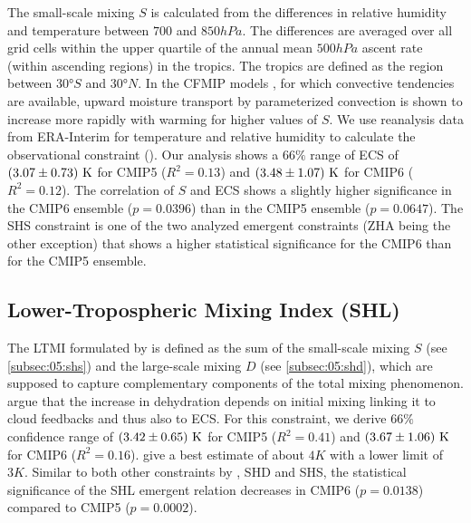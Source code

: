 The small-scale mixing $S$ \autocite{Sherwood2014} is calculated from the
differences in relative humidity and temperature between $700$ and $850
\unit{hPa}$. The differences are averaged over all grid cells within the upper
quartile of the annual mean $500 \unit{hPa}$ ascent rate (within ascending
regions) in the tropics. The tropics are defined as the region between $30
\unit{\degree S}$ and $30 \unit{\degree N}$. In the \ac{CFMIP} models
\autocite{Webb2017}, for which convective tendencies are available, upward
moisture transport by parameterized convection is shown to increase more
rapidly with warming for higher values of $S$. We use reanalysis data from
ERA-Interim \autocite{Dee2011} for temperature and relative humidity to
calculate the observational constraint (). Our analysis shows
a $66 \unit{\%}$ range of \ac{ECS} of $\pmrangeunit{3.07}{0.73}{K}$ for
\acs{CMIP}5 ($R^2 = 0.13$) and $\pmrangeunit{3.48}{1.07}{K}$ for \acs{CMIP}6
($R^2 = 0.12$). The correlation of $S$ and \acs{ECS} shows a slightly higher
significance in the \acs{CMIP}6 ensemble ($p = 0.0396$) than in the \acs{CMIP}5
ensemble ($p = 0.0647$). The SHS constraint is one of the two analyzed emergent
constraints (ZHA being the other exception) that shows a higher statistical
significance for the \acs{CMIP}6 than for the \acs{CMIP}5 ensemble.


\subsection{Lower-Tropospheric Mixing Index (SHL)}
\label{subsec:05:shl}

The \ac{LTMI} formulated by \textcite{Sherwood2014} is defined as the sum of
the small-scale mixing $S$ (see \cref{subsec:05:shs}) and the large-scale
mixing $D$ (see \cref{subsec:05:shd}), which are supposed to capture
complementary components of the total mixing phenomenon.
\Textcite{Sherwood2014} argue that the increase in dehydration depends on
initial mixing linking it to cloud feedbacks and thus also to \ac{ECS}. For
this constraint, we derive  $66 \unit{\%}$ confidence range of
$\pmrangeunit{3.42}{0.65}{K}$ for \acs{CMIP}5 ($R^2 = 0.41$) and
$\pmrangeunit{3.67}{1.06}{K}$ for \acs{CMIP}6 ($R^2 = 0.16$).
\Textcite{Sherwood2014} give a best estimate of about $4 \unit{K}$ with a lower
limit of $3 \unit{K}$. Similar to both other constraints by
\textcite{Sherwood2014}, SHD and SHS, the statistical significance of the SHL
emergent relation decreases in \acs{CMIP}6 ($p = 0.0138$) compared to
\acs{CMIP}5 ($p = 0.0002$).


